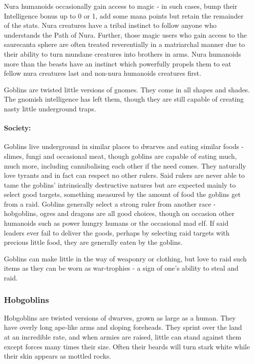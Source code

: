 Nura humanoids occasionally gain access to magic - in such cases, bump their Intelligence bonus up to 0 or 1, add some mana points but retain the remainder of the stats.  Nura creatures have a tribal instinct to follow anyone who understands the Path of Nura.  Further, those magic users who gain access to the saurecanta sphere are often treated reverentially in a matriarchal manner due to their ability to turn mundane creatures into brothers in arms.  Nura humanoids more than the beasts have an instinct which powerfully propels them to eat fellow nura creatures last and non-nura humanoids creatures first.

\label{goblin}
\goblin

Goblins are twisted little versions of gnomes.  They come in all shapes and shades.  The gnomish intelligence has left them, though they are still capable of creating nasty little underground traps.

\paragraph{Society:} Goblins live underground in similar places to dwarves and eating similar foods - slimes, fungi and occasional meat, though goblins are capable of eating much, much more, including cannibalising each other if the need comes.  They naturally love tyrants and in fact can respect no other rulers.  Said rulers are never able to tame the goblins' intrinsically destructive natures but are expected mainly to select good targets, something measured by the amount of food the goblins get from a raid.  Goblins generally select a strong ruler from another race - hobgoblins, ogres and dragons are all good choices, though on occasion other humanoids such as power hungry humans or the occasional mad elf.  If said leaders ever fail to deliver the goods, perhaps by selecting raid targets with precious little food, they are generally eaten by the goblins.

	Goblins can make little in the way of weaponry or clothing, but love to raid such items as they can be worn as war-trophies - a sign of one's ability to steal and raid.

\subsubsection{Hobgoblins}\label{hobgoblin}
\hobgoblin

Hobgoblins are twisted versions of dwarves, grown as large as a human.  They have overly long ape-like arms and sloping foreheads.  They sprint over the land at an incredible rate, and when armies are raised, little can stand against them except forces many times their size.  Often their beards will turn stark white while their skin appears as mottled rocks.

